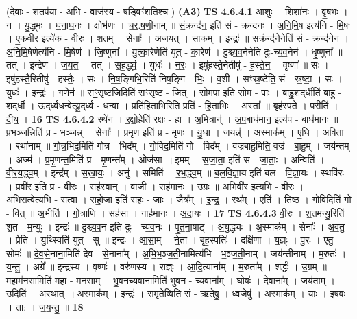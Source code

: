 \documentclass[17pt]{extarticle}
\begin{document}
                  \newline
                      (दे॒वाः - श॒तप॑या - अ॒भि - वाज॑स्य॒ - षड्विꣳ॑शतिश्च )  \textbf{(A3)} \newline \newline
                                \textbf{ TS 4.6.4.1} \newline
                  आ॒शुः । शिशा॑नः । वृ॒ष॒भः । न । यु॒द्ध्मः । घ॒ना॒घ॒नः । क्षोभ॑णः । च॒र॒.ष॒णी॒नाम् ॥ सं॒क्रन्द॑न॒ इति॑ सं - क्रन्द॑नः । अ॒नि॒मि॒ष इत्य॑नि - मि॒षः । ए॒क॒वी॒र इत्ये॑क - वी॒रः । श॒तम् । सेनाः᳚ । अ॒ज॒य॒त् । सा॒कम् । इन्द्रः॑ ॥ स॒क्रंन्द॑ने॒नेति॑ सं - क्रन्द॑नेन । अ॒नि॒मि॒षेणेत्य॑नि - मि॒षेण॑ । जि॒ष्णुना᳚ । यु॒त्का॒रेणेति॑ युत् - का॒रेण॑ । दु॒श्च्य॒व॒नेनेति॑ दुः-च्य॒व॒नेन॑ । धृ॒ष्णुना᳚ ॥ तत् । इन्द्रे॑ण । ज॒य॒त॒ । तत् । स॒ह॒द्ध्वं॒ । युधः॑ । न॒रः॒ । इषु॑हस्ते॒नेतीषु॑ - ह॒स्ते॒न॒ । वृष्णा᳚ ॥ सः । इषु॑हस्तै॒रितीषु॑ - ह॒स्तैः॒ । सः । नि॒ष॒ङ्गिभि॒रिति॑ निष॒ङ्गि - भिः॒ । व॒शी । सꣳस्र॒ष्टेति॒ सं - स्र॒ष्टा॒ । सः । युधः॑ । इन्द्रः॑ । ग॒णेन॑ ॥ सꣳ॒॒सृ॒ष्ट॒जिदिति॑ सꣳसृष्ट - जित् । सो॒म॒पा इति॑ सोम - पाः । बा॒हु॒श॒द्‌र्धीति॑ बाहु - श॒द्‌र्धी । ऊ॒द्‌र्ध्वध॒न्वेत्यू॒द्‌र्ध्व - ध॒न्वा॒ । प्रति॑हिताभि॒रिति॒ प्रति॑ - हि॒ता॒भिः॒ । अस्ता᳚ ॥ बृह॑स्पते । परीति॑ । दी॒य॒ । \textbf{  16} \newline
                  \newline
                                \textbf{ TS 4.6.4.2} \newline
                  रथे॑न । र॒क्षो॒हेति॑ रक्षः - हा । अ॒मित्रान्॑ । अ॒प॒बाध॑मान॒ इत्य॑प - बाध॑मानः ॥ प्र॒भ॒ञ्जन्निति॑ प्र - भ॒ञ्जन्न् । सेनाः᳚ । प्र॒मृ॒ण इति॑ प्र - मृ॒णः । यु॒धा । जयन्न्॑ । अ॒स्माक᳚म् । ए॒धि॒ । अ॒वि॒ता । रथा॑नाम् ॥ गो॒त्र॒भिद॒मिति॑ गोत्र - भिद᳚म् । गो॒विद॒मिति॑ गो - विद᳚म् । वज्र॑बाहु॒मिति॒ वज्र॑ - बा॒हु॒म् । जय॑न्तम् । अज्म॑ । प्र॒मृ॒णन्त॒मिति॑ प्र - मृ॒णन्त᳚म् । ओज॑सा ॥ इ॒मम् । स॒जा॒ता॒ इति॑ स - जा॒ताः॒ । अन्विति॑ । वी॒र॒य॒द्ध्व॒म् । इन्द्र᳚म् । स॒खा॒यः॒ । अनु॑ । समिति॑ । र॒भ॒द्ध्व॒म् ॥ ब॒ल॒वि॒ज्ञा॒य इति॑ बल - वि॒ज्ञा॒यः । स्थवि॑रः । प्रवी॑र॒ इति॒ प्र - वी॒रः॒ । सह॑स्वान् । वा॒जी । सह॑मानः । उ॒ग्रः ॥ अ॒भिवी॑र॒ इत्य॒भि - वी॒रः॒ । अ॒भिस॒त्वेत्य॒भि - स॒त्वा॒ । स॒हो॒जा इति॑ सहः - जाः । जैत्र᳚म् । इ॒न्द्र॒ । रथ᳚म् । एति॑ । ति॒ष्ठ॒ । गो॒विदिति॑ गो - वित् ॥ अ॒भीति॑ । गो॒त्राणि॑ । सह॑सा । गाह॑मानः । अ॒दा॒यः । \textbf{  17 } \newline
                  \newline
                                \textbf{ TS 4.6.4.3} \newline
                  वी॒रः । श॒तम॑न्यु॒रिति॑ श॒त - म॒न्युः॒ । इन्द्रः॑ ॥ दु॒श्च्य॒व॒न इति॑ दुः - च्य॒व॒नः । पृ॒त॒ना॒षाट् । अ॒यु॒द्ध्यः । अ॒स्माक᳚म् । सेनाः᳚ । अ॒व॒तु॒ । प्रेति॑ । यु॒थ्स्विति॑ युत् - सु ॥ इन्द्रः॑ । आ॒सा॒म् । ने॒ता । बृह॒स्पतिः॑ । दक्षि॑णा । य॒ज्ञ्ः । पु॒रः । ए॒तु॒ । सोमः॑ ॥ दे॒व॒से॒नाना॒मिति॑ देव - से॒नाना᳚म् । अ॒भि॒भ॒ञ्ज॒ती॒नामित्य॑भि - भ॒ञ्ज॒ती॒नाम् । जय॑न्तीनाम् । म॒रुतः॑ । य॒न्तु॒ । अग्रे᳚ ॥ इन्द्र॑स्य । वृष्णः॑ । वरु॑णस्य । राज्ञ्ः॑ । आ॒दि॒त्याना᳚म् । म॒रुता᳚म् । शर्द्धः॑ । उ॒ग्रम् ॥ म॒हाम॑नसा॒मिति॑ म॒हा - म॒न॒सा॒म् । भु॒व॒न॒च्य॒वाना॒मिति॑ भुवन - च्य॒वाना᳚म् । घोषः॑ । दे॒वाना᳚म् । जय॑ताम् । उदिति॑ । अ॒स्था॒त् ॥ अ॒स्माक᳚म् । इन्द्रः॑ । समृ॑ते॒ष्विति॒ सं - ऋ॒ते॒षु॒ । ध्व॒जेषु॑ । अ॒स्माक᳚म् । याः । इष॑वः । ता: । ज॒य॒न्तु॒ ॥ \textbf{  18} \newline
\end{document}
